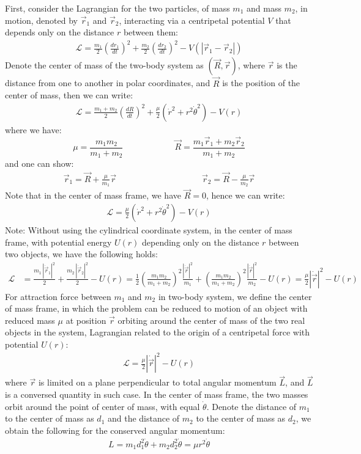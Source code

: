 \documentclass[11pt,oneside]{book}
\theoremstyle{break}
\theoremstyle{break}
\newcommand{\note}{\color{red}Note: \color{black}}
\begin{document}
First, consider the Lagrangian for the two particles, of mass $m_1$ and mass $m_2$, in motion, denoted by $\vec{r}_1$ and $\vec{r}_2$, interacting via a centripetal potential $V$ that depends only on the distance $r$ between them:
\begin{align*}
\mathcal{L} = \frac{m_1}{2}\left(\frac{dr_1}{dt}\right)^2 + \frac{m_2}{2}\left(\frac{dr_2}{dt}\right)^2 - V(|\vec{r}_1 - \vec{r}_2|)
\end{align*}
Denote the center of mass of the two-body system as $(\vec{R}, \vec{r})$, where $\vec{r}$ is the distance from one to another in polar coordinates, and $\vec{R}$ is the position of the center of mass, then    we can write:
\begin{align*}
\mathcal{L} = \frac{m_1 + m_2}{2}\left(\frac{dR}{dt}\right)^2 + \frac{\mu}{2}\left(\dot{r}^2+r^2\dot{\theta}^2\right) - V(r)
\end{align*}
where we have: 
$$ \mu = \frac{m_1m_2}{m_1+m_2}\qquad\qquad\qquad \vec{R} = \frac{m_1\vec{r}_1+m_2\vec{r}_2}{m_1+m_2}$$
and one can show:
\begin{align*}
\vec{r}_1 =\vec{R}+\frac{\mu}{m_1}\vec{r}\qquad\qquad\qquad\qquad\qquad \vec{r}_2 = \vec{R}-\frac{\mu}{m_2}\vec{r}
\end{align*}
Note that in the center of mass frame, we have $\vec{R} = 0$, hence we can write:
\begin{align*}
\mathcal{L} = \frac{\mu}{2}\left( \dot{r}^2 + r^2\dot{\theta}^2\right) - V(r) 
\end{align*}
\note Without using the cylindrical coordinate system, in the center of mass frame, with potential energy $U(r)$ depending only on the distance $r$ between two objects, we have the following holds:
\begin{align*}
\mathcal{L}&=\frac{m_1\, |\dot{\vec{r}}_1|^2}{2} + \frac{m_2\, |\dot{\vec{r}}_2|^2}{2} - U(r) = \frac{1}{2}\left( \frac{m_1 m_2}{m_1 + m_2}\right)^2\frac{|\dot{\vec{r}}|^2}{m_1} + \left( \frac{m_1 m_2}{m_1 + m_2}\right)^2 \frac{|\dot{\vec{r}}|^2}{m_2} - U(r)=\frac{\mu}{2}|\dot{\vec{r}}|^2 - U(r)
\end{align*}
For attraction force between $m_1$ and $m_2$ in two-body system, we define the center of mass frame, in which the problem can be reduced to motion of an object with reduced mass $\mu$ at position $\vec{r}$ orbiting around the center of mass of the two real objects in the system, Lagrangian related to the origin of a centripetal force with potential $U(r)$:
\begin{align*}
\mathcal{L} = \frac{\mu}{2}|\dot{\vec{r}}|^2 - U(r)
\end{align*}
where $\vec{r}$ is limited on a plane perpendicular to total angular momentum $\vec{L}$, and $\vec{L}$ is a conversed quantity in such case. In the center of mass frame, the two masses orbit around the point of center of mass, with equal $\dot{\theta}$. Denote the distance of $m_1$ to the center of mass as $d_1$ and the distance of $m_2$ to the center of mass as $d_2$, we obtain the following for the conserved angular momentum:
\begin{align*}
L= m_1 d_1^2 \dot{\theta} + m_2 d_2^2 \dot{\theta} = \mu r^2 \dot{\theta}
\end{align*}
\hfill\break
\hfill\break
\newpage
\end{document}

